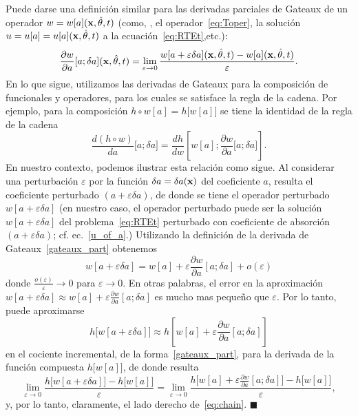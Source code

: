 Puede darse una definición similar para las derivadas parciales de Gateaux 
de un operador $w = w[a](\mathbf{x},\hat{\theta},t)$ (como, \eg, el operador~\eqref{eq:Toper}, 
la solución $u = u[a]=u[a](\mathbf{x},\hat{\theta},t)$ a la ecuación~\eqref{eq:RTEt},etc.):
\begin{equation}\label{gateaux_part}
  \frac{\partial w}{\partial a}[a; \delta a ](\mathbf{x},\hat{\theta},t) = \lim_{\varepsilon \to 0} \frac{w[a +\varepsilon \delta a](\mathbf{x},\hat{\theta},t)
    - w[a](\mathbf{x},\hat{\theta},t)}{\varepsilon}.
\end{equation}
En lo que sigue, utilizamos las derivadas de Gateaux para la composición 
de funcionales y operadores, para los cuales se satisface la regla de la cadena. 
Por ejemplo, para la composición  $h\circ w [a] = h\big[w[a]\big]$ 
se tiene la identidad de la regla de la cadena
\begin{equation}\label{eq:chain}
  \frac{d (h\circ w)}{da} \big[a;\delta a\big]= \frac{d h}{
    d w}\left[w[a];\frac{\partial w}{\partial a} \big[a;\delta
    a\big]\right].
\end{equation}
En nuestro contexto, podemos ilustrar esta relación como sigue. 
Al considerar una perturbación $\varepsilon$ por la función $\delta a = \delta a(\mathbf{x})$ 
del coeficiente $a$, resulta el coeficiente perturbado $(a+\varepsilon\delta a)$, 
de donde se tiene el operador perturbado $w[a+\varepsilon\delta a]$ (en nuestro caso, 
el operador perturbado puede ser \eg la solución $w[a+\varepsilon\delta a]$ del problema~\eqref{eq:RTEt} perturbado con coeficiente de absorción $(a+\varepsilon\delta a)$; 
cf. ec.~\eqref{u_of_a}.) Utilizando la definición de la derivada 
de Gateaux~\eqref{gateaux_part} obtenemos
\[
  w[a+\varepsilon\delta a] = w[a]+\varepsilon \frac{\partial
    w}{\partial a}[a; \delta a ] + o(\varepsilon)
\]
donde $\frac{o(\varepsilon)}{\varepsilon}\to 0$ para $\varepsilon\to 0$. 
En otras palabras, el error en la aproximación $w[a+\varepsilon\delta a] \approx w[a]+\varepsilon \frac{\partial
  w}{\partial a}[a; \delta a ]$ es mucho mas pequeño que $\varepsilon$. 
Por lo tanto, puede aproximarse   
\[
  h\big[w[a+\varepsilon\delta a]\big] \approx h\left[w[a]+\varepsilon \frac{\partial
    w}{\partial a}[a; \delta a ]\right]
\]
en el cociente incremental, de la forma~\eqref{gateaux_part}, 
para la derivada de la función compuesta $h\big[w[a]\big]$, 
de donde resulta 
\[
 \lim_{\varepsilon\to 0}\frac{h\big[w[a+\varepsilon\delta a]\big]
     -h\big[w[a]\big]}{\varepsilon}  = \lim_{\varepsilon\to
    0} \frac{h\big[w[a]+\varepsilon \frac{\partial w}{\partial a}[a;
    \delta a ]\big]-h\big[w[a]\big]}{\varepsilon},
\]
y, por lo tanto, claramente, el lado derecho de~\eqref{eq:chain}.  $\blacksquare$

